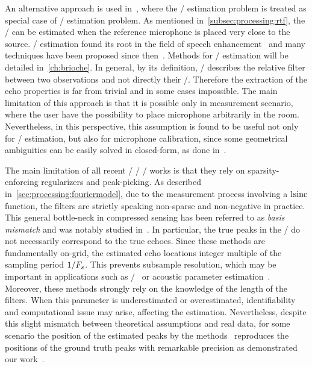 \mynewline
An alternative approach is used in~, where the \RIR/ estimation problem is treated as special case of \RTF/ estimation problem.
As mentioned in~\cref{subsec:processing:rtf}, the \RTF/ can be estimated when the reference microphone is placed very close to the source.
\RTF/ estimation found its root in the field of speech enhancement~ and many techniques have been proposed since then~.
Methods for \RTF/ estimation will be detailed in~\cref{ch:brioche}.
In general, by its definition, \RTF/ describes the relative filter between two observations and not directly their \RIRs/.
Therefore the extraction of the echo properties is far from trivial and in some cases impossible.
The main limitation of this approach is that it is possible only in measurement scenario, where the user have the possibility to place microphone arbitrarily in the room.
Nevertheless, in this perspective, this assumption is found to be useful not only for \RTF/ estimation, but also for microphone calibration, since
some geometrical ambiguities can be easily solved in closed-form, as done in~.

\mynewline
The main limitation of all recent \FIR/ \SIMO/ \BCE/ works is that they rely on sparsity-enforcing regularizers and peak-picking.
As described in~\cref{sec:processing:fouriermodel}, due to the measurement process involving a l$\operatorname*{sinc}$ function, the filters are strictly speaking non-sparse and non-negative in practice.
This general bottle-neck in compressed sensing has been referred to as \textit{basis mismatch} and was notably studied in~.
In particular, the true peaks in the \RIR/ do not necessarily correspond to the true echoes.
Since these methods are fundamentally on-grid, the estimated echo locations integer multiple of the sampling period $1/F_s$.
This prevents subsample resolution, which may be important in applications such as \RooGE/~ or acoustic parameter estimation~.
Moreover, these methods strongly rely on the knowledge of the length of the filters.
When this parameter is underestimated or overestimated, identifiability and computational issue may arise, affecting the estimation.
Nevertheless, despite this slight mismatch between theoretical assumptions and real data, for some scenario the position of the estimated peaks by the methods~ reproduces the positions of the ground truth peaks with remarkable precision as demonstrated our work~.


